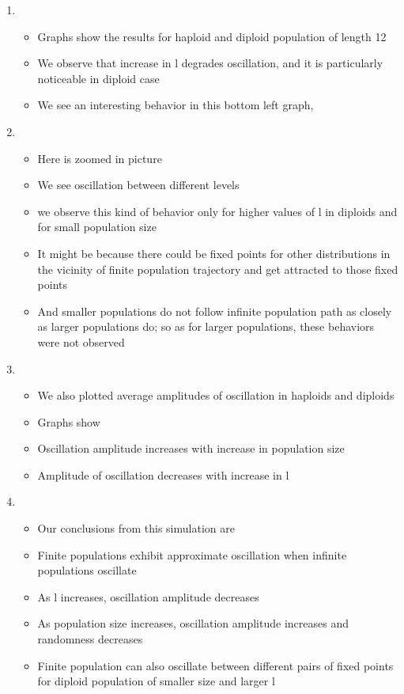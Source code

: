 \documentclass{article}
\begin{document}
\begin{enumerate}
\item
  \begin{itemize}
  \item Graphs show the results for haploid and diploid population of
    length 12
   \item We observe that increase in l degrades oscillation, and it is
     particularly noticeable in diploid case
  \item We see an interesting behavior in this bottom left graph,
  \end{itemize}
    
\item
  \begin{itemize}
  \item Here is zoomed in picture
   \item We see oscillation between different levels
  \item we observe this kind of behavior only for higher values of l
    in diploids and for small population size
  \item It might be because there could be fixed points for other
    distributions in the vicinity of finite population trajectory and
    get attracted to those fixed points
  \item And smaller populations do not follow infinite population path
    as closely as larger populations do; so as for larger populations,
    these behaviors were not observed
  \end{itemize}
    
\item
  \begin{itemize}
  \item We also plotted average amplitudes of oscillation in haploids
    and diploids
   \item Graphs show
   \item Oscillation amplitude increases with increase in population
     size
   \item Amplitude of oscillation decreases with increase in l
  \end{itemize}
    
\item
  \begin{itemize}
  \item Our conclusions from this simulation are
   \item Finite populations exhibit approximate oscillation when
     infinite populations oscillate
  \item As l increases, oscillation amplitude decreases
  \item As population size increases, oscillation amplitude increases
    and randomness decreases
  \item Finite population can also oscillate between different pairs of
    fixed points for diploid population of smaller size and larger l
  \end{itemize}
  

\end{enumerate}
\end{document}
